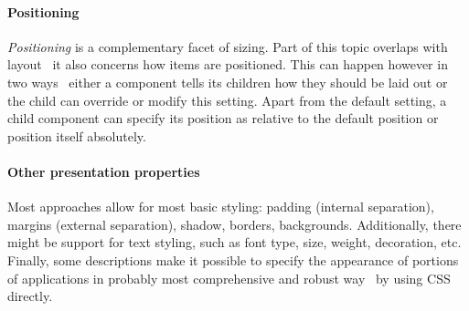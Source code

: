\paragraph{Positioning}
\emph{Positioning} is a complementary facet of sizing.
Part of this topic overlaps with layout \textendash\ it also concerns how items are positioned.
This can happen however in two ways \textendash\ either a component tells its children how they should be laid out or the child can override or modify this setting.
Apart from the default setting, a child component can specify its position as relative to the default position or position itself absolutely.

\paragraph{Other presentation properties}
Most approaches allow for most basic styling: padding (internal separation), margins (external separation), shadow, borders, backgrounds.
Additionally, there might be support for text styling, such as font type, size, weight, decoration, etc.
Finally, some descriptions make it possible to specify the appearance of portions of applications in probably most comprehensive and robust way \textendash\ by using CSS directly.
